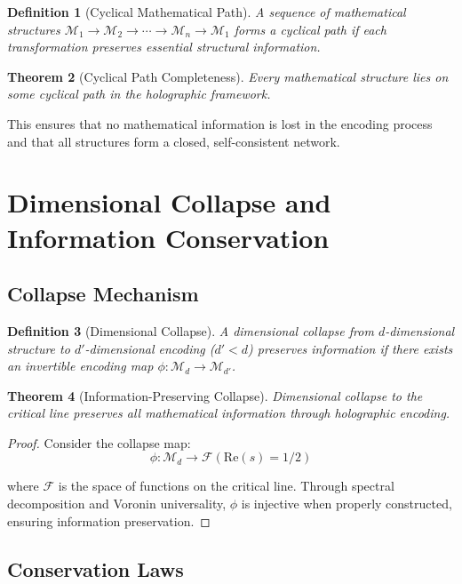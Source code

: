 \documentclass[12pt]{article}
\newtheorem{theorem}{Theorem}[section]
\newtheorem{definition}[theorem]{Definition}
\begin{document}
\begin{definition}[Cyclical Mathematical Path]
A sequence of mathematical structures $\mathcal{M}_1 \to \mathcal{M}_2 \to \cdots \to \mathcal{M}_n \to \mathcal{M}_1$ forms a cyclical path if each transformation preserves essential structural information.
\end{definition}

\begin{theorem}[Cyclical Path Completeness]
Every mathematical structure lies on some cyclical path in the holographic framework.
\end{theorem}

This ensures that no mathematical information is lost in the encoding process and that all structures form a closed, self-consistent network.

\section{Dimensional Collapse and Information Conservation}

\subsection{Collapse Mechanism}

\begin{definition}[Dimensional Collapse]
A dimensional collapse from $d$-dimensional structure to $d'$-dimensional encoding ($d' < d$) preserves information if there exists an invertible encoding map $\phi: \mathcal{M}_d \to \mathcal{M}_{d'}$.
\end{definition}

\begin{theorem}[Information-Preserving Collapse]
Dimensional collapse to the critical line preserves all mathematical information through holographic encoding.
\end{theorem}

\begin{proof}
Consider the collapse map:
$$\phi: \mathcal{M}_d \to \mathcal{F}(\text{Re}(s) = 1/2)$$

where $\mathcal{F}$ is the space of functions on the critical line. Through spectral decomposition and Voronin universality, $\phi$ is injective when properly constructed, ensuring information preservation.
\end{proof}

\subsection{Conservation Laws}
\end{document}
